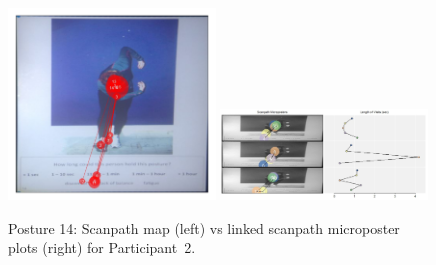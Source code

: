 \documentclass[11pt]{asaproc}
\begin{document}
\begin{figure}[t]
\begin{center} 
\includegraphics[width=0.49\textwidth]{figures/Subject13_scanpath_posture14.jpg} \hspace{1pt}
\includegraphics[height=0.45\textwidth,width=0.49\textwidth]{figures/Subject13_LSM_posture14_clipped.jpg}
\end{center}
\caption{\label{ScanpathsLSM14}Posture 14: Scanpath map (left) vs linked scanpath microposter plots (right) for Participant~2.}
\end{figure}
\end{document}
